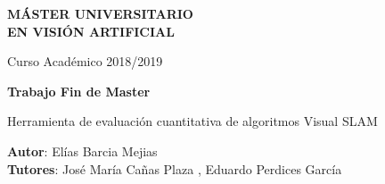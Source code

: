 \thispagestyle{empty}
\vspace{5cm}


\begin{center}
  {\large {\bf MÁSTER UNIVERSITARIO\\ EN VISIÓN ARTIFICIAL}}
  \vspace{5mm}
 
  {\large {Curso Académico 2018/2019}}

  \vspace{2cm}

  {\large {\bf  Trabajo Fin de Master}}

  \vspace{3cm}

  {\Large {{\Huge { Herramienta de evaluación cuantitativa de algoritmos Visual SLAM }} \\[1cm] }}




  \vspace{5cm}
  {\bf Autor}: Elías Barcia Mejias\\
  {\bf Tutores}: José María Cañas Plaza , Eduardo Perdices García
\end{center}
